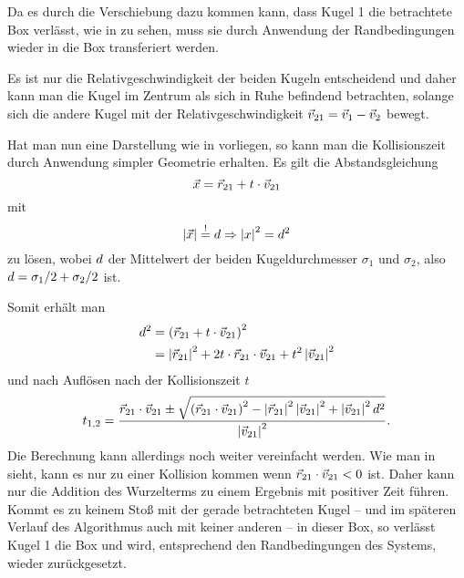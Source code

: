 

Da es durch die Verschiebung dazu kommen kann, dass Kugel 1 die betrachtete Box verlässt, wie in  zu sehen, muss sie durch Anwendung der Randbedingungen wieder in die Box transferiert werden.



Es ist nur die Relativgeschwindigkeit der beiden Kugeln entscheidend und daher kann man die Kugel im Zentrum als sich in Ruhe befindend betrachten, solange sich die andere Kugel mit der Relativgeschwindigkeit $\vec{v}_{21}=\vec{v}_1-\vec{v}_2$ bewegt.
 


Hat man nun eine Darstellung wie in  vorliegen, so kann man die Kollisionszeit durch Anwendung simpler Geometrie erhalten.
Es gilt die Abstandsgleichung 
\begin{equation}
	\vec{x} = \vec{r}_{21} + t\cdot\vec{v}_{21}
\end{equation}
mit 
\begin{equation}
	\left|\vec{x}\right| \overset{!}{=} d \Rightarrow \left|x\right|^2 = d^2
\end{equation}
zu lösen, wobei $d$ der Mittelwert der beiden Kugeldurchmesser $\sigma_1$ und $\sigma_2$, also $d=\sigma_1/2 + \sigma_2/2$ ist.

Somit erhält man
\begin{align}
	d^2	&= \left(\vec{r}_{21} + t\cdot\vec{v}_{21} \right)^2 \\
			&= \left|\vec{r}_{21}\right|^2 + 2t\cdot\vec{r}_{21}\cdot\vec{v}_{21} + t^2\left|\vec{v}_{21}\right|^2
\end{align}
und nach Auflösen nach der Kollisionszeit $t$
\begin{equation}
	t_{1,2}=\frac{\vec{r}_{21}\cdot\vec{v}_{21} \pm \sqrt{\left(\vec{r}_{21}\cdot\vec{v}_{21}\right)^2 - \left|\vec{r}_{21}\right|^2\left|\vec{v}_{21}\right|^2 + \left|\vec{v}_{21}\right|^2d^2}}{\left|\vec{v}_{21}\right|^2}.
\end{equation}
Die Berechnung kann allerdings noch weiter vereinfacht werden. Wie man in  sieht, kann es nur zu einer Kollision kommen wenn $\vec{r}_{21}\cdot\vec{v}_{21} < 0$ ist. Daher kann nur die Addition des Wurzelterms zu einem Ergebnis mit positiver Zeit führen.\\
Kommt es zu keinem Stoß mit der gerade betrachteten Kugel -- und im späteren Verlauf des Algorithmus auch mit keiner anderen -- in dieser Box, so verlässt Kugel 1 die Box und wird, entsprechend den Randbedingungen des Systems, wieder zurückgesetzt.